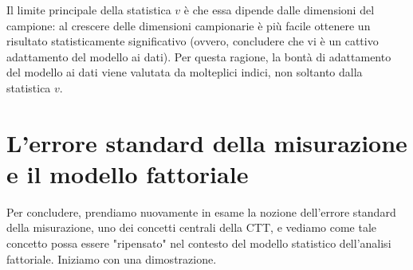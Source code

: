 \documentclass[
  11pt,
]{krantz}
\theoremstyle{definition}
\theoremstyle{definition}
\theoremstyle{definition}
\theoremstyle{definition}
\theoremstyle{remark}
\begin{document}
Il limite principale della statistica \(v\) è che essa dipende dalle dimensioni del campione: al crescere delle dimensioni campionarie è più facile ottenere un risultato statisticamente significativo (ovvero, concludere che vi è un cattivo adattamento del modello ai dati). Per questa ragione, la bontà di adattamento del modello ai dati viene valutata da molteplici indici, non soltanto dalla statistica \(v\).

\hypertarget{lerrore-standard-della-misurazione-e-il-modello-fattoriale}{%
\section{L'errore standard della misurazione e il modello fattoriale}\label{lerrore-standard-della-misurazione-e-il-modello-fattoriale}}

Per concludere, prendiamo nuovamente in esame la nozione dell'errore standard della misurazione, uno dei concetti centrali della CTT, e vediamo come tale concetto possa essere "ripensato" nel contesto del modello statistico dell'analisi fattoriale. Iniziamo con una dimostrazione.
\end{document}
